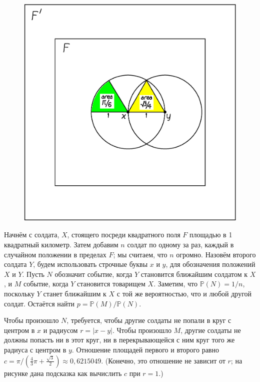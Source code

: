 \begin{figure}[h!]
\centering
\includegraphics[scale=0.5]{Figs/Toughies/disks}
\end{figure}%

Начнём с солдата, $X$, стоящего посреди квадратного поля $F$ площадью в 1 квадратный километр.
Затем добавим $n$ солдат по одному за раз, каждый в случайном положении в пределах $F$; мы считаем, что $n$ огромно.
Назовём второго солдата $Y$, будем использовать строчные буквы $x$ и $y$, для обозначения положений $X$ и $Y$.
Пусть $N$ обозначит событие, когда $Y$ становится ближайшим солдатом к $X$, 
и $M$ событие, когда $Y$ становится товарищем $X$.
Заметим, что $\mathbb{P}(N)=1/n$, поскольку $Y$ станет ближайшим к $X$ с той же вероятностью, что и любой другой солдат.
Остаётся найти $p=\mathbb{P}(M)/\mathbb{P}(N)$.

Чтобы произошло $N$, требуется, чтобы другие солдаты не попали в круг с центром в $x$ и радиусом $r=|x-y|$.
Чтобы произошло $M$, другие солдаты не должны попасть ни в этот круг, ни в перекрывающейся с ним круг того же радиуса с центром в $y$.
Отношение площадей первого и второго равно $c=\pi/(\tfrac43\pi+\tfrac{\sqrt{3}}{2}) \approx 0{,}6215049$. (Конечно, это отношение не зависит от $r$; на рисунке дана подсказка как вычислить $c$ при $r=1$.)

